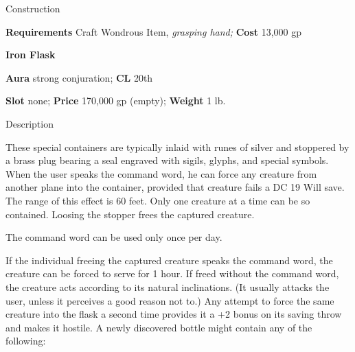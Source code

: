 Construction
				
\textbf{Requirements} Craft Wondrous Item,\textit{ grasping hand;}\textbf{ Cost }13,000 gp
				
\textbf{Iron Flask}
				
\textbf{Aura} strong conjuration;\textbf{ CL }20th
				
\textbf{Slot} none; \textbf{Price} 170,000 gp (empty); \textbf{Weight} 1 lb.
				
Description
				
These special containers are typically inlaid with runes of silver and stoppered by a brass plug bearing a seal engraved with sigils, glyphs, and special symbols. When the user speaks the command word, he can force any creature from another plane into the container, provided that creature fails a DC 19 Will save. The range of this effect is 60 feet. Only one creature at a time can be so contained. Loosing the stopper frees the captured creature. 
				
The command word can be used only once per day.
				
If the individual freeing the captured creature speaks the command word, the creature can be forced to serve for 1 hour. If freed without the command word, the creature acts according to its natural inclinations. (It usually attacks the user, unless it perceives a good reason not to.) Any attempt to force the same creature into the flask a second time provides it a +2 bonus on its saving throw and makes it hostile. A newly discovered bottle might contain any of the following:\\

